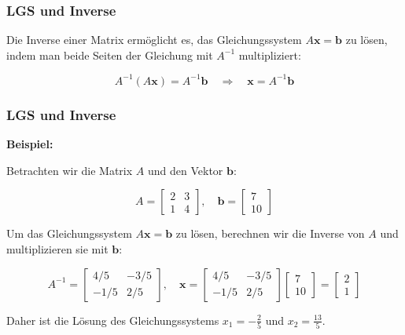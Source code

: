 \documentclass{beamer}
\begin{document}
\begin{frame}
  \frametitle{LGS und Inverse}
  Die Inverse einer Matrix ermöglicht es, das Gleichungssystem $A \mathbf{x} = \mathbf{b}$ zu lösen, indem man beide Seiten der Gleichung mit $A^{-1}$ multipliziert:
  
  \[
  A^{-1} (A \mathbf{x}) = A^{-1} \mathbf{b} \quad \Rightarrow \quad \mathbf{x} = A^{-1} \mathbf{b}
  \]
\end{frame}

\begin{frame}
  \frametitle{LGS und Inverse}
  \textbf{Beispiel:}
  
  Betrachten wir die Matrix $A$ und den Vektor $\mathbf{b}$:
  
  \[
  A = \begin{bmatrix} 2 & 3 \\ 1 & 4 \end{bmatrix}, \quad \mathbf{b} = \begin{bmatrix} 7 \\ 10 \end{bmatrix}
  \]
  
  Um das Gleichungssystem $A \mathbf{x} = \mathbf{b}$ zu lösen, berechnen wir die Inverse von $A$ und multiplizieren sie mit $\mathbf{b}$:
  
  \[
  A^{-1} = \begin{bmatrix} 4/5 & -3/5 \\ -1/5 & 2/5 \end{bmatrix}, \quad \mathbf{x} = \begin{bmatrix} 4/5 & -3/5 \\ -1/5 & 2/5 \end{bmatrix} \begin{bmatrix} 7 \\ 10 \end{bmatrix} = \begin{bmatrix} 2 \\ 1 \end{bmatrix}
  \]
  
  Daher ist die Lösung des Gleichungssystems $x_1 = -\frac{2}{5}$ und $x_2 = \frac{13}{5}$. 
\end{frame}
\end{document}
